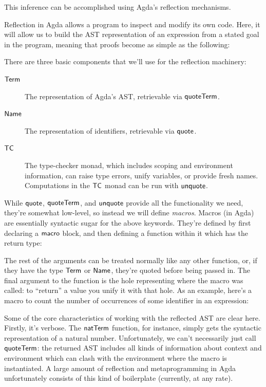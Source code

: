 \documentclass[draft, twocolumn]{article}
\theoremstyle{definition}
\theoremstyle{remark}
\begin{document}
This inference can be accomplished using Agda's reflection
mechanisms\cite{van_der_walt_reflection_2012}.

Reflection in Agda allows a program to inspect and modify its own code. Here, it
will allow us to build the AST representation of an expression from a stated
goal in the program, meaning that proofs become as simple as the following:

There are three basic components that we'll use for the reflection machinery:
\begin{description}
  \item[\(\AgdaDatatype{Term}\)] The representation of Agda's AST, retrievable
    via \(\AgdaKeyword{quoteTerm}\).
  \item[\(\AgdaDatatype{Name}\)] The representation of identifiers, retrievable
    via \(\AgdaKeyword{quote}\).
  \item[\(\AgdaDatatype{TC}\)] The type-checker monad, which includes scoping
    and environment information, can raise type errors, unify variables, or
    provide fresh names. Computations in the \(\AgdaDatatype{TC}\) monad can be
    run with \(\AgdaKeyword{unquote}\).
\end{description}

While \(\AgdaKeyword{quote}\), \(\AgdaKeyword{quoteTerm}\), and
\(\AgdaKeyword{unquote}\) provide all the functionality we need, they're
somewhat low-level, so instead we will define \emph{macros}. Macros (in Agda)
are essentially syntactic sugar for the above keywords. They're defined by first
declaring a \(\AgdaKeyword{macro}\) block, and then defining a function within
it which has the return type:

The rest of the arguments can be treated normally like any other function, or,
if they have the type \(\AgdaDatatype{Term}\) or \(\AgdaDatatype{Name}\),
they're quoted before being passed in. The final argument to the function is the
hole representing where the macro was called: to ``return'' a value you unify
it with that hole. As an example, here's a macro to count the number of
occurrences of some identifier in an expression:

Some of the core characteristics of working with the reflected AST are clear
here. Firstly, it's verbose. The \(\AgdaFunction{natTerm}\) function, for
instance, simply gets the syntactic representation of a natural number.
Unfortunately, we can't necessarily just call \(\AgdaKeyword{quoteTerm}\): the
returned AST includes all kinds of information about context and environment
which can clash with the environment where the macro is instantiated. A large
amount of reflection and metaprogramming in Agda unfortunately consists of this
kind of boilerplate (currently, at any rate).
\end{document}
